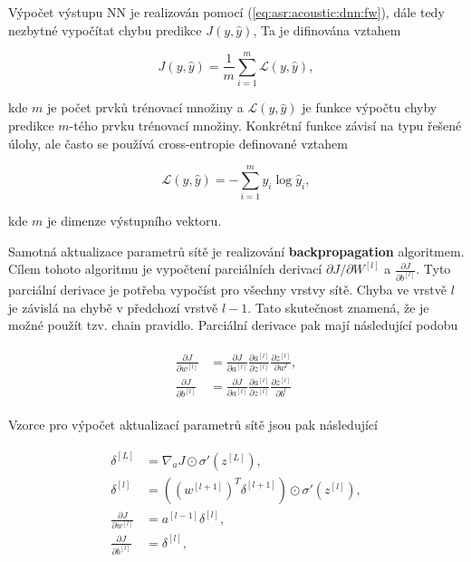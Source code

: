 \noindent Výpočet výstupu NN je realizován pomocí (\ref{eq:asr:acoustic:dnn:fw}), dále tedy nezbytné vypočítat chybu predikce $J\left(y, \hat{y}\right)$, Ta je difinována vztahem

\begin{equation}
  J\left(y, \hat{y}\right) = \frac{1}{m} \sum_{i=1}^{m}\mathcal{L}\left(y, \hat{y}\right),
  \label{eq:asr:acoustic:dnn:cost}
\end{equation}

\noindent kde $m$ je počet prvků trénovací množiny a $\mathcal{L}\left(y, \hat{y}\right)$ je funkce výpočtu chyby predikce $m$-tého prvku trénovací množiny. Konkrétní funkce závisí na typu řešené úlohy, ale často se používá cross-entropie definované vztahem

\begin{equation}
  \mathcal{L}\left(y, \hat{y}\right) = - \sum_{i=1}^{m} y_i \log \hat{y}_i,
  \label{eq:asr:acoustic:dnn:cost}
\end{equation}

\noindent kde $m$ je dimenze výstupního vektoru.

Samotná aktualizace parametrů sítě je realizování \textbf{backpropagation} algoritmem. Cílem tohoto algoritmu je vypočtení parciálních derivací $\partial J / \partial W^{[l]}$ a $\frac{\partial J}{\partial b^{[l]}}$. Tyto parciální derivace je potřeba vypočíst pro všechny vrstvy sítě. Chyba ve vrstvě $l$ je závislá na chybě v předchozí vrstvě $l-1$. Tato skutečnost znamená, že je možné použít tzv. chain pravidlo. Parciální derivace pak mají následující podobu

\begin{align}
  \begin{split}
    \frac{\partial J}{\partial w^{[l]}} & = \frac{\partial J}{\partial a^{[l]}} \frac{\partial a^{[l]}}{\partial z^{[l]}} \frac{\partial z^{[l]}}{\partial w^{l}}, \\
    \frac{\partial J}{\partial b^{[l]}} & = \frac{\partial J}{\partial a^{[l]}} \frac{\partial a^{[l]}}{\partial z^{[l]}} \frac{\partial z^{[l]}}{\partial b^{l}}
  \end{split}
  \label{eq:asr:acoustic:dnn:partial}
\end{align}

\noindent Vzorce pro výpočet aktualizací parametrů sítě jsou pak následující

\begin{align}
  \begin{split}
    \delta^{[L]} & = \nabla_{a} J \odot \sigma'\left(z^{[L]}\right), \\
    \delta^{[l]} & = \left(\left(w^{[l+1]}\right)^T \delta^{[l+1]}\right) \odot \sigma'\left(z^{[l]}\right), \\
    \frac{\partial J}{\partial w^{[l]}} & = a^{[l-1]}\delta^{[l]}, \\
    \frac{\partial J}{\partial b^{[l]}} & = \delta^{[l]},
  \end{split}
  \label{eq:asr:acoustic:dnn:bp}
\end{align}

